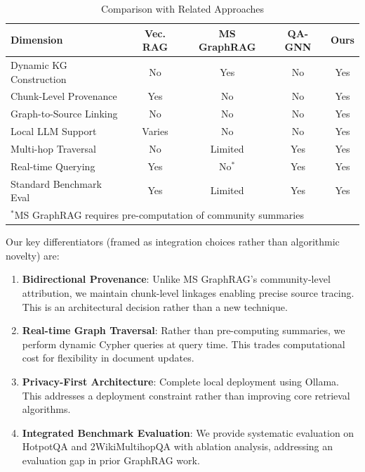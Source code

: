 \documentclass[conference]{IEEEtran}
\begin{document}
\begin{table}[htbp]
\caption{Comparison with Related Approaches}
\label{tab:comparison}
\centering
\footnotesize
\begin{tabular}{lcccc}
\toprule
\textbf{Dimension} & \textbf{Vec. RAG} & \textbf{MS GraphRAG} & \textbf{QA-GNN} & \textbf{Ours} \\
\midrule
Dynamic KG Construction & No & Yes & No & Yes \\
Chunk-Level Provenance & Yes & No & No & Yes \\
Graph-to-Source Linking & No & No & No & Yes \\
Local LLM Support & Varies & No & No & Yes \\
Multi-hop Traversal & No & Limited & Yes & Yes \\
Real-time Querying & Yes & No$^*$ & Yes & Yes \\
Standard Benchmark Eval & Yes & Limited & Yes & Yes \\
\bottomrule
\multicolumn{5}{l}{\footnotesize $^*$MS GraphRAG requires pre-computation of community summaries}
\end{tabular}
\end{table}

Our key differentiators (framed as integration choices rather than algorithmic novelty) are:

\begin{enumerate}
    \item \textbf{Bidirectional Provenance}: Unlike MS GraphRAG's community-level attribution, we maintain chunk-level linkages enabling precise source tracing. This is an architectural decision rather than a new technique.
    
    \item \textbf{Real-time Graph Traversal}: Rather than pre-computing summaries, we perform dynamic Cypher queries at query time. This trades computational cost for flexibility in document updates.
    
    \item \textbf{Privacy-First Architecture}: Complete local deployment using Ollama. This addresses a deployment constraint rather than improving core retrieval algorithms.
    
    \item \textbf{Integrated Benchmark Evaluation}: We provide systematic evaluation on HotpotQA and 2WikiMultihopQA with ablation analysis, addressing an evaluation gap in prior GraphRAG work.
\end{enumerate}
\end{document}
